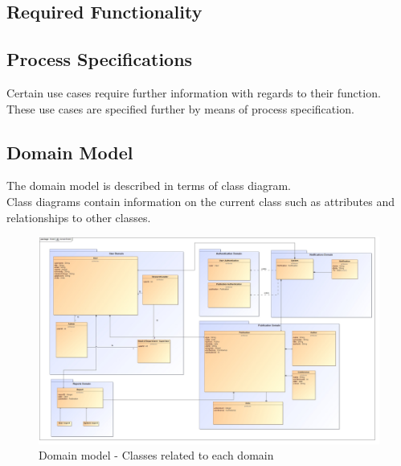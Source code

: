 \documentclass{article}
\begin{document}
		\subsection{Required Functionality}\label{subsec:requiredfunctionionality}
	
		\subsection{Process Specifications}\label{subsec:processspecification}
		Certain use cases require further information with regards to their function.\\ These use cases are specified further by means of process specification.
		
		\subsection{Domain Model}\label{subsec:domainmodel}
		The domain model is described in terms of class diagram.\\ Class diagrams contain information on the current class such as attributes and relationships to other classes.
			\begin{figure}[h]				
				\includegraphics[width=\linewidth]{../Diagrams/Domain Model/domainModel.jpg}
				\caption{ Domain model - Classes related to each domain }
			\end{figure}
			
\end{document}
